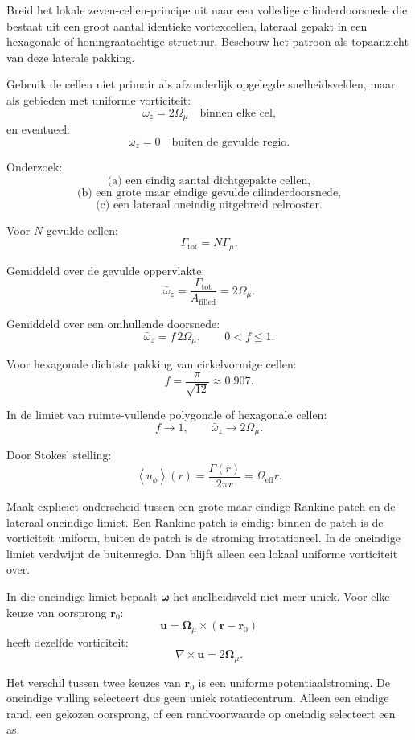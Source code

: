 \documentclass[11pt,a4paper]{article}
\begin{document}
Breid het lokale zeven-cellen-principe uit naar een volledige cilinderdoorsnede die bestaat uit een groot aantal identieke vortexcellen, lateraal gepakt in een hexagonale of honingraatachtige structuur. Beschouw het patroon als topaanzicht van deze laterale pakking.

Gebruik de cellen niet primair als afzonderlijk opgelegde snelheidsvelden, maar als gebieden met uniforme vorticiteit:
\[
\omega_z = 2\Omega_{\mu}
\quad \text{binnen elke cel,}
\]
en eventueel:
\[
\omega_z = 0
\quad \text{buiten de gevulde regio.}
\]

Onderzoek:
\[
\text{(a) een eindig aantal dichtgepakte cellen,}
\]
\[
\text{(b) een grote maar eindige gevulde cilinderdoorsnede,}
\]
\[
\text{(c) een lateraal oneindig uitgebreid celrooster.}
\]

Voor \(N\) gevulde cellen:
\[
\Gamma_{\mathrm{tot}}=N\Gamma_{\mu}.
\]

Gemiddeld over de gevulde oppervlakte:
\[
\bar{\omega}_z
=
\frac{\Gamma_{\mathrm{tot}}}{A_{\mathrm{filled}}}
=
2\Omega_{\mu}.
\]

Gemiddeld over een omhullende doorsnede:
\[
\bar{\omega}_z=f\,2\Omega_{\mu},
\qquad
0<f\leq1.
\]

Voor hexagonale dichtste pakking van cirkelvormige cellen:
\[
f=\frac{\pi}{\sqrt{12}}\approx0.907.
\]

In de limiet van ruimte-vullende polygonale of hexagonale cellen:
\[
f\rightarrow1,
\qquad
\bar{\omega}_z\rightarrow2\Omega_{\mu}.
\]

Door Stokes' stelling:
\[
\left\langle u_{\phi}\right\rangle(r)
=
\frac{\Gamma(r)}{2\pi r}
=
\Omega_{\mathrm{eff}}r.
\]

Maak expliciet onderscheid tussen een grote maar eindige Rankine-patch en de lateraal oneindige limiet. Een Rankine-patch is eindig: binnen de patch is de vorticiteit uniform, buiten de patch is de stroming irrotationeel. In de oneindige limiet verdwijnt de buitenregio. Dan blijft alleen een lokaal uniforme vorticiteit over.

In die oneindige limiet bepaalt \(\boldsymbol{\omega}\) het snelheidsveld niet meer uniek. Voor elke keuze van oorsprong \(\mathbf{r}_0\):
\[
\mathbf{u}
=
\boldsymbol{\Omega}_{\mu}
\times
(\mathbf{r}-\mathbf{r}_0)
\]
heeft dezelfde vorticiteit:
\[
\nabla\times\mathbf{u}
=
2\boldsymbol{\Omega}_{\mu}.
\]

Het verschil tussen twee keuzes van \(\mathbf{r}_0\) is een uniforme potentiaalstroming. De oneindige vulling selecteert dus geen uniek rotatiecentrum. Alleen een eindige rand, een gekozen oorsprong, of een randvoorwaarde op oneindig selecteert een as.
\end{document}
